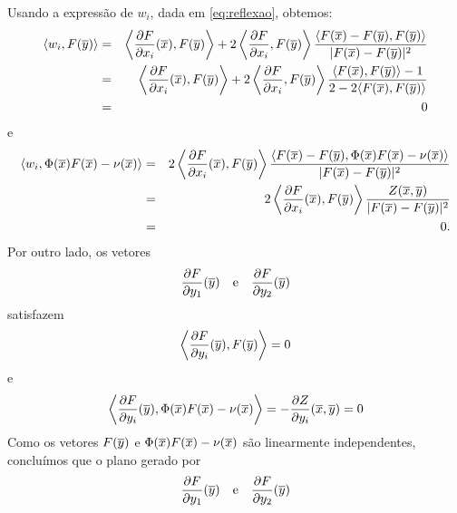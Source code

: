 \begin{demonstracao}
	Usando a express\~ao de $w_i$, dada em \eqref{eq:reflexao}, obtemos:
	\begin{eqnarray*}
		\langle w_i, F(\overline{y}) \rangle &=& \left\langle \frac{\partial F}{\partial x_i}(\overline{x}), F(\overline{y}) \right\rangle + 2 \left\langle \frac{\partial F}{\partial x_i}, F(\overline{y}) \right\rangle \frac{\langle F(\overline{x}) - F(\overline{y}),F(\overline{y}) \rangle}{| F(\overline{x}) - F(\overline{y}) |^2} \\
		&=& \left\langle \frac{\partial F}{\partial x_i}(\overline{x}), F(\overline{y}) \right\rangle 
		+ 2 \left\langle \frac{\partial F}{\partial x_i}, F(\overline{y}) \right\rangle \frac{\langle F(\overline{x}),F(\overline{y}) \rangle - 1}{2 - 2 \langle F(\overline{x}), F(\overline{y}) \rangle} \\
		&=& 0
	\end{eqnarray*}
	e
	\begin{eqnarray*}
		\langle w_i, \Phi(\overline{x}) F(\overline{x}) - \nu(\overline{x}) \rangle &=&
		2 \left\langle \frac{\partial F}{\partial x_i}(\overline{x}), F(\overline{y}) \right\rangle \frac{\langle F(\overline{x}) - F(\overline{y}), \Phi(\overline{x}) F(\overline{x}) - \nu(\overline{x}) \rangle}{| F(\overline{x}) - F(\overline{y}) |^2} \\
		& = & 2 \left\langle \frac{\partial F}{\partial x_i}(\overline{x}), F(\overline{y}) \right\rangle \frac{Z(\overline{x},\overline{y})}{| F(\overline{x}) - F(\overline{y}) |^2} \\
		& = & 0.
	\end{eqnarray*}
	Por outro lado, os vetores
	\begin{equation*}
	\frac{\partial F}{\partial y_1}(\overline{y}) \quad \text{e} \quad \frac{\partial F}
	{\partial y_2}(\overline{y})
	\end{equation*}
	satisfazem
	\begin{equation*}
	\left\langle \frac{\partial F}{\partial y_i}(\overline{y}), F(\overline{y})\right\rangle = 0
	\end{equation*}
	e
	\begin{equation*}
	\left\langle \frac{\partial F}{\partial y_i}(\overline{y}), \Phi(\overline{x}) F(\overline{x}) - 
	\nu(\overline{x}) \right\rangle = -\frac{\partial Z}{\partial y_i}(\overline{x},\overline{y}) 
	= 0
	\end{equation*}
	Como os vetores $F(\overline{y})$ e $ \Phi(\overline{x}) F(\overline{x}) - \nu(\overline{x})$
	são linearmente independentes, conclu\'imos que o plano gerado por
	\begin{equation*}
	\frac{\partial F}{\partial y_1}(\overline{y}) \quad \text{e} \quad 
	\frac{\partial F}{\partial y_2}(\overline{y})
	\end{equation*}

\end{demonstracao}
